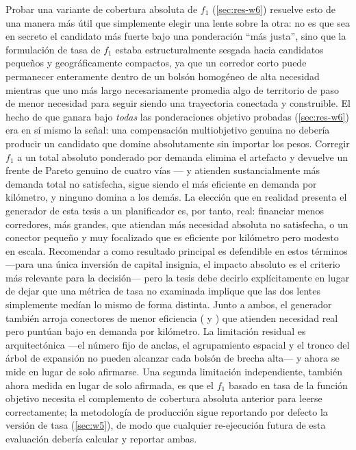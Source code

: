 Probar una variante de cobertura absoluta de $f_1$ (\cref{sec:res-w6}) resuelve esto de
una manera más útil que simplemente elegir una lente sobre la otra: no es que
 sea en secreto el candidato más fuerte bajo una ponderación ``más
justa'', sino que la formulación de tasa de $f_1$ estaba estructuralmente sesgada hacia
candidatos pequeños y geográficamente compactos, ya que un corredor corto puede
permanecer enteramente dentro de un bolsón homogéneo de alta necesidad mientras que uno
más largo necesariamente promedia algo de territorio de paso de menor necesidad para
seguir siendo una trayectoria conectada y construible. El hecho de que 
ganara bajo \emph{todas} las ponderaciones objetivo probadas (\cref{sec:res-w6}) era en
sí mismo la señal: una compensación multiobjetivo genuina no debería producir un
candidato que domine absolutamente sin importar los pesos. Corregir $f_1$ a un total
absoluto ponderado por demanda elimina el artefacto y devuelve un frente de Pareto
genuino de cuatro vías --- y  atienden sustancialmente más
demanda total no satisfecha,  sigue siendo el más eficiente en demanda por
kilómetro, y ninguno domina a los demás. La elección que en realidad presenta el
generador de esta tesis a un planificador es, por tanto, real: financiar menos
corredores, más grandes, que atiendan más necesidad absoluta no satisfecha, o un
conector pequeño y muy focalizado que es eficiente por kilómetro pero modesto en
escala. Recomendar a  como resultado principal es defendible en estos
términos ---para una única inversión de capital insignia, el impacto absoluto es el
criterio más relevante para la decisión--- pero la tesis debe decirlo explícitamente en
lugar de dejar que una métrica de tasa no examinada implique que las dos lentes
simplemente medían lo mismo de forma distinta. Junto a ambos,
el generador también arroja conectores de menor eficiencia ( y
) que atienden necesidad real pero puntúan bajo en demanda por
kilómetro. La limitación residual es arquitectónica ---el número fijo de anclas, el
agrupamiento espacial y el tronco del árbol de expansión no pueden alcanzar cada
bolsón de brecha alta--- y ahora se mide en lugar de solo afirmarse. Una segunda
limitación independiente, también ahora medida en lugar de solo afirmada, es que el
$f_1$ basado en tasa de la función objetivo necesita el complemento de cobertura
absoluta anterior para leerse correctamente; la metodología de producción sigue
reportando por defecto la versión de tasa (\cref{sec:w5}), de modo que cualquier
re-ejecución futura de esta evaluación debería calcular y reportar ambas.

